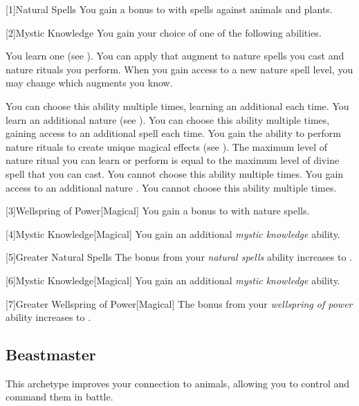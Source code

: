         [1]{Natural Spells} You gain a  bonus to  with spells against animals and plants.

        [2]{Mystic Knowledge}
        You gain your choice of one of the following abilities.
        {
             You learn one  (see ).
                You can apply that augment to nature spells you cast and nature rituals you perform.
                When you gain access to a new nature spell level, you may change which augments you know.
                \par You can choose this ability multiple times, learning an additional  each time.
             You learn an additional nature  (see ).
                You can choose this ability multiple times, gaining access to an additional spell each time.
             You gain the ability to perform nature rituals to create unique magical effects (see ).
                The maximum level of nature ritual you can learn or perform is equal to the maximum level of divine spell that you can cast.
                You cannot choose this ability multiple times.
             You gain access to an additional nature .
                You cannot choose this ability multiple times.
        }

        [3]{Wellspring of Power}[Magical]
        You gain a  bonus to  with nature spells.

        [4]{Mystic Knowledge}[Magical]
        You gain an additional \textit{mystic knowledge} ability.

        [5]{Greater Natural Spells} The bonus from your \textit{natural spells} ability increases to .

        [6]{Mystic Knowledge}[Magical]
        You gain an additional \textit{mystic knowledge} ability.

        [7]{Greater Wellspring of Power}[Magical]
        The bonus from your \textit{wellspring of power} ability increases to .

    \subsection{Beastmaster}
        This archetype improves your connection to animals, allowing you to control and command them in battle.

